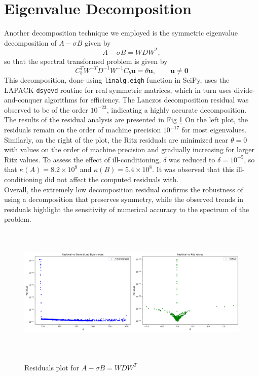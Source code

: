 \section{Eigenvalue Decomposition}
Another decomposition technique we employed is the symmetric eigenvalue decomposition of $A-\sigma B$ given by
\begin{equation}
    A-\sigma B = WDW^T,
\end{equation}
so that the spectral transformed problem is given by
\begin{equation}\label{3.4}
	C_b^T W^{-T}D^{-1}W^{-1} C_b \mathbf{u} = \theta \mathbf{u}, \qquad \mathbf{u} \neq \mathbf{0}
\end{equation}
This decomposition, done using \texttt{linalg.eigh} function in SciPy, uses the LAPACK \texttt{dsyevd} routine for real symmetric matrices, which in turn uses divide-and-conquer algorithms for efficiency. The Lanczos decomposition residual was observed to be of the order $10^{-23}$, indicating a highly accurate decomposition. The results of the residual analysis are presented in Fig \ref{fig:EigDecompRes}
On the left plot, the residuals remain on the order of machine precision $10^{-17}$ for most eigenvalues. Similarly, on the right of the plot, the Ritz residuals are minimized near $\theta = 0$ with values on the order of machine precision and gradually increasing for larger Ritz values. To assess the effect of ill-conditioning, $\delta$ was reduced to $\delta = 10^{-5}$, so that $\kappa(A) = 8.2 \times 10^9$ and $\kappa(B) = 5.4 \times 10^8$. It was observed that this ill-conditioning did not affect the computed residuals with.\\
Overall, the extremely low decomposition residual confirms the robustness of using a decomposition that preserves symmetry, while the observed trends in residuals highlight the sensitivity of numerical accuracy to the spectrum of the problem.

\begin{figure}
\centering
        \caption{Residuals plot for $A -\sigma B = WDW^T$}
	\includegraphics[height=2.5in]{./Plots/eigdecomp/eig_residual_plots.png}
        \label{fig:EigDecompRes}
\end{figure}